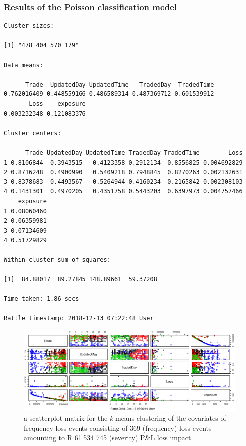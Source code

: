 \documentclass[a4paper]{article}
\begin{document}
\subsubsection{Results of the Poisson classification model}
\begin{verbatim}
Cluster sizes:

[1] "478 404 570 179"

Data means:

      Trade  UpdatedDay UpdatedTime   TradedDay  TradedTime 
0.762016409 0.448559166 0.486589314 0.487369712 0.601539912 
       Loss    exposure 
0.003232348 0.121083376 

Cluster centers:

      Trade UpdatedDay UpdatedTime TradedDay TradedTime        Loss
1 0.8106844  0.3943515   0.4123358 0.2912134  0.8556825 0.004692829
2 0.8716248  0.4900990   0.5409218 0.7948845  0.8270263 0.002132631
3 0.8378683  0.4493567   0.5264944 0.4160234  0.2165842 0.002308103
4 0.1431301  0.4970205   0.4351758 0.5443203  0.6397973 0.004757466
    exposure
1 0.08060460
2 0.06359981
3 0.07134609
4 0.51729829

Within cluster sum of squares:

[1]  84.88017  89.27845 148.89661  59.37208

Time taken: 1.86 secs

Rattle timestamp: 2018-12-13 07:22:48 User
\end{verbatim}
\begin{figure}
\centering
\includegraphics[width=250mm,scale=1.5]{CA14MeansPlot.eps}
\caption[Scatterplot matrix for a \emph{k}-means clustering of size 4]{a scatterplot matrix for the \emph{k}-means clustering of the covariates of frequency loss events consisting of 369 (frequency) loss events amounting to R 61 534 745 (severity) P\&L loss impact.}
\label{Fig6}
\end{figure}
\newpage


\end{document}
